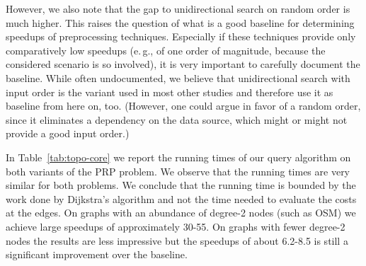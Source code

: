 \documentclass{sig-alternate}
\newcommand{\eg}{e.\,g.\xspace}
\begin{document}
However, we also note that the gap to unidirectional search on random order is much higher.
This raises the question of what is a good baseline for determining speedups of preprocessing techniques.
Especially if these techniques provide only comparatively low speedups (\eg, of one order of magnitude, because the considered scenario is so involved),
it is very important to carefully document the baseline.
While often undocumented, we believe that unidirectional search with input order is the variant
used in most other studies and therefore use it as baseline from here on, too.
(However, one could argue in favor of a random order, since it  
eliminates a dependency on the data source, which might or might not provide a good input order.)






In Table~\ref{tab:topo-core} we report the running times of our query algorithm on both variants of the PRP problem.
We observe that the running times are very similar for both problems. 
We conclude that the running time is bounded by the work done by Dijkstra's algorithm and not the time needed to evaluate the costs at the edges.
On graphs with an abundance of degree-2 nodes (such
as OSM) we achieve large speedups of approximately 30-55. On graphs
with fewer degree-2 nodes the results are less impressive but the
speedups of about 6.2-8.5 is still a significant improvement over the
baseline.
\end{document}
